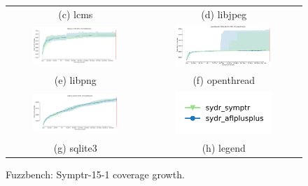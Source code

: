 \begin{figure}[h]
{\begin{tabular}{cc}
            (c) lcms                                                                                                 & (d) libjpeg                                                                                                    \\[6pt]
            \includegraphics[width=0.65\textwidth]{assets/fuzzbench/symptr-15-1/libpng-1.2.56_coverage_growth.png}   & \includegraphics[width=0.65\textwidth]{assets/fuzzbench/symptr-15-1/openthread-2019-12-23_coverage_growth.png} \\
            (e) libpng                                                                                               & (f) openthread                                                                                                 \\[6pt]
            \includegraphics[width=0.65\textwidth]{assets/fuzzbench/symptr-15-1/sqlite3_ossfuzz_coverage_growth.png} & \includegraphics[width=0.65\textwidth]{assets/fuzzbench/symptr-15-1/fuzzbench-legend.png}                      \\
            (g) sqlite3                                                                                              & (h) legend                                                                                                     \\[6pt]
        \end{tabular}
    }
    \caption{Fuzzbench: Symptr-15-1 coverage growth.}
    \label{fig:fuzzbench:symptr-15-1}
\end{figure}

